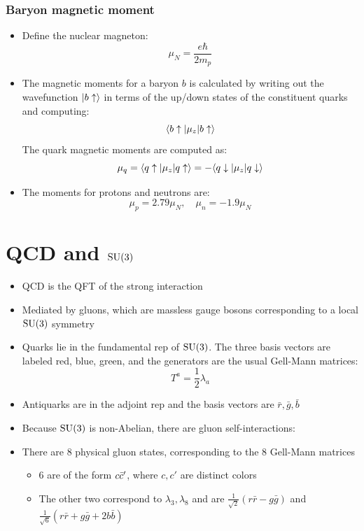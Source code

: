 \subsubsection{Baryon magnetic moment}
\begin{itemize}
  \item Define the nuclear magneton:
  \begin{equation}
    \mu_N = \frac{e\hbar}{2m_p}
  \end{equation}
  \item The magnetic moments for a baryon $b$ is calculated by writing out the wavefunction $|b\uparrow\rangle$ in terms of the up/down states of the constituent quarks and computing:
  \begin{equation}
    \langle b\uparrow | \mu_z | b\uparrow\rangle
  \end{equation}
  The quark magnetic moments are computed as:
  \begin{equation}
    \mu_q = \langle q\uparrow | \mu_z | q\uparrow\rangle = - \langle q\downarrow | \mu_z | q\downarrow\rangle
  \end{equation}
  \item The moments for protons and neutrons are:
  \begin{equation}
    \mu_p = 2.79\mu_N,\quad \mu_n = -1.9\mu_N
  \end{equation}
\end{itemize}

\section{QCD and $\operatorname{SU}(3)$}
\begin{itemize}
  \item QCD is the QFT of the strong interaction
    \item Mediated by gluons, which are massless gauge bosons corresponding to a local $\operatorname{SU}(3)$ symmetry
    \item Quarks lie in the fundamental rep of $\operatorname{SU}(3)$. The three basis vectors are labeled red, blue, green, and the generators are the usual Gell-Mann matrices:
    \begin{equation}
      T^a = \frac{1}{2}\lambda_a
    \end{equation}
    \item Antiquarks are in the adjoint rep and the basis vectors are $\bar r,\bar g, \bar b$
    \item Because $\operatorname{SU}(3)$ is non-Abelian, there are gluon self-interactions:
    \item There are 8 physical gluon states, corresponding to the 8 Gell-Mann matrices
    \begin{itemize}
      \item 6 are of the form $c\bar{c}'$, where $c,c'$ are distinct colors
      \item The other two correspond to $\lambda_3,\lambda_8$ and are $\frac{1}{\sqrt2}(r\bar r-g\bar g)$ and $\frac{1}{\sqrt6}(r\bar r + g\bar g + 2b\bar b)$
    \end{itemize}
\end{itemize}

